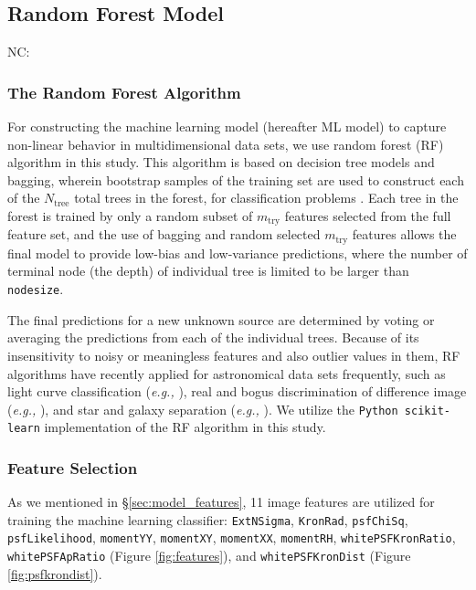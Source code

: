\documentclass[twocolumn]{aastex62}
\newcommand{\NC}[1]{{\color{gray} NC: {#1}}}
\begin{document}
\subsection{Random Forest Model}\label{sec:rf_model}
\NC{
\subsubsection{The Random Forest Algorithm}\label{sec:rf_alg}
For constructing the machine learning model (hereafter ML model) 
to capture non-linear behavior in multidimensional data sets, 
we use random forest (RF) algorithm in this study.  
This algorithm is based on decision tree models \citep{Quinlan93} 
and bagging, 
wherein bootstrap samples of the training set are used to construct 
each of the $N_{\mathrm{tree}}$ total trees in the forest,
for classification problems \citep{Breiman96, Breiman01}. 
Each tree in the forest is trained by only a random subset of $m_{\mathrm{try}}$ 
features selected from the full feature set, 
and the use of bagging and random selected $m_{\mathrm{try}}$ features 
allows the final model to provide low-bias and low-variance predictions, 
where the number of terminal node (the depth) of individual tree is limited to be larger than \texttt{nodesize}. 

The final predictions for a new unknown source are determined by voting or averaging the predictions 
from each of the individual trees. 
Because of its insensitivity to noisy or meaningless features and also outlier values in them, 
RF algorithms have recently applied for astronomical data sets frequently, 
such as light curve classification ({\it e.g., } \citealt{Richards12a, Huppenkothen17}), 
real and bogus discrimination of difference image ({\it e.g., }  \citealt{Brink13, Wright15}), 
and star and galaxy separation ({\it e.g., } \citealt{Vasconcellos11, Miller17}). 
We utilize the \texttt{Python scikit-learn} implementation of the RF algorithm \citep{Pedregosa12} in this study. 

\subsubsection{Feature Selection}
As we mentioned in \S\ref{sec:model_features}, 11 image features are utilized for training the machine learning classifier: 
\texttt{ExtNSigma}, \texttt{KronRad}, \texttt{psfChiSq}, \texttt{psfLikelihood}, \texttt{momentYY}, \texttt{momentXY}, \texttt{momentXX}, \texttt{momentRH}, 
\texttt{whitePSFKronRatio}, \texttt{whitePSFApRatio} (Figure \ref{fig:features}), 
and \texttt{whitePSFKronDist} (Figure \ref{fig:psfkrondist}). 

}
\end{document}
